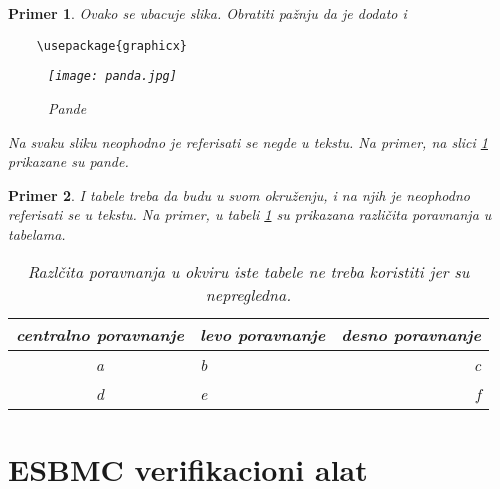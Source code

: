 \documentclass[a4paper]{article}
\newtheorem{primer}{Primer}[section]
\begin{document}
	\begin{primer} Ovako se ubacuje slika. Obratiti pažnju da je dodato i 
	\begin{verbatim}
	\usepackage{graphicx}
	\end{verbatim}

	\begin{figure}[h!]
	\begin{center}
	\texttt{[image: panda.jpg]}
	\end{center}
	\caption{Pande}
	\label{fig:pande}
	\end{figure}

	Na svaku sliku neophodno je referisati se negde u tekstu. Na primer, na slici \ref{fig:pande} prikazane su pande. 
	\end{primer}

	\begin{primer} I tabele treba da budu u svom okruženju, i na njih je neophodno referisati se u tekstu. Na primer, u tabeli \ref{tab:tabela1} su prikazana različita poravnanja u tabelama.

	\begin{table}[h!]
	\begin{center}
	\caption{Razlčita poravnanja u okviru iste tabele ne treba koristiti jer su nepregledna.}
	\begin{tabular}{|c|l|r|} \hline
	centralno poravnanje& levo poravnanje& desno poravnanje\\ \hline
	a &b&c\\ \hline
	d &e&f\\ \hline
	\end{tabular}
	\label{tab:tabela1}
	\end{center}
	\end{table}

	\end{primer}





	\section{ESBMC verifikacioni alat}
	\label{sec:ESBMC}
\end{document}
